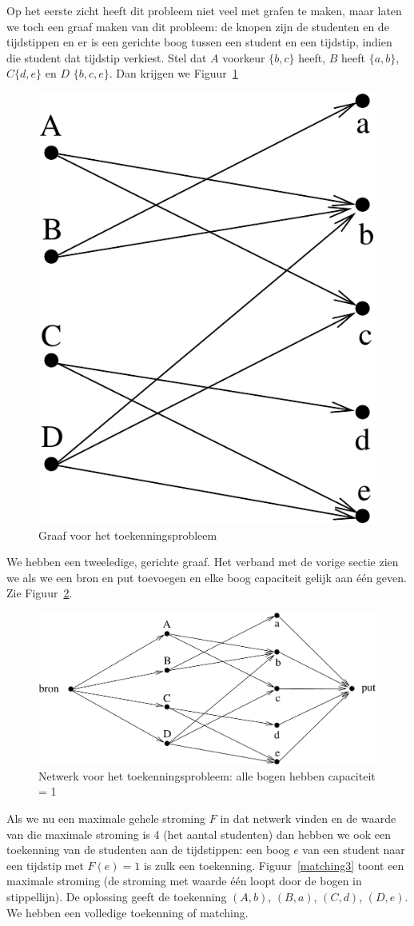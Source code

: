 Op het eerste zicht heeft dit probleem niet veel met grafen te maken,
maar laten we toch een graaf maken van dit probleem: de knopen zijn de
studenten en de tijdstippen en er is een gerichte boog tussen een
student en een tijdstip, indien die student dat tijdstip verkiest.
Stel dat $A$ voorkeur $\{b,c\}$ heeft, $B$ heeft $\{a,b\}$, 
$C \{d,e\}$ en $D$
$\{b,c,e\}$. Dan krijgen we Figuur~\ref{matching1}

\begin{figure}[ht]
\begin{center}
\includegraphics[width=0.17\linewidth,keepaspectratio]{matching1} %
\end{center}
\caption{Graaf voor het toekenningsprobleem\label{matching1}}
\end{figure}

We hebben een tweeledige, gerichte graaf. Het verband met de vorige
sectie zien we als we een bron en put toevoegen en elke boog
capaciteit gelijk aan \'{e}\'{e}n geven. Zie Figuur~\ref{matching2}.

\begin{figure}[ht]
\begin{center}
\includegraphics[width=0.5\linewidth,keepaspectratio]{matching2} %
\end{center}
\caption{Netwerk voor het toekenningsprobleem: alle bogen hebben capaciteit = 1\label{matching2}}
\end{figure}

Als we nu een maximale 
gehele
stroming $F$ in dat netwerk vinden en de waarde
van die maximale stroming is 4 (het aantal studenten) dan hebben we
ook een toekenning van de studenten aan de tijdstippen: een boog $e$ van
een student naar een tijdstip met $F(e) = 1$ is zulk een toekenning.
Figuur~\ref{matching3} toont een maximale stroming (de stroming met
waarde \'{e}\'{e}n loopt door de bogen in stippellijn). De oplossing
geeft de toekenning $(A,b)$, $(B,a)$, $(C,d)$, $(D,e)$. We hebben een
volledige toekenning of matching.

